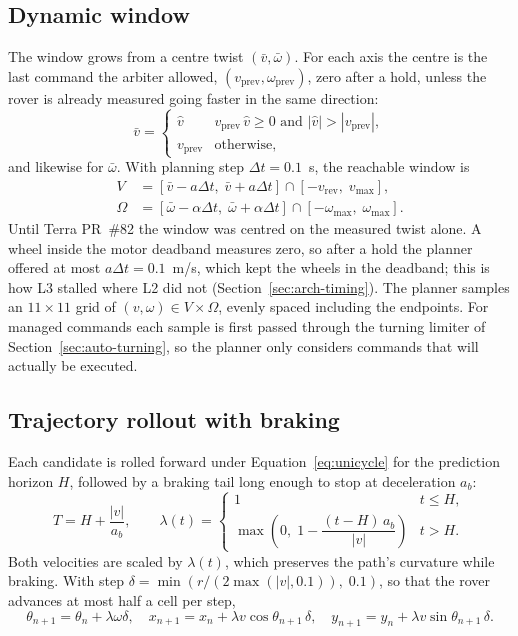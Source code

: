 \subsection{Dynamic window}

The window grows from a centre twist $(\bar v, \bar\omega)$.
For each axis the centre is the last command the arbiter allowed, $(v_{\text{prev}}, \omega_{\text{prev}})$, zero after a hold, unless the rover is already measured going faster in the same direction:
\begin{equation}
  \bar v = \begin{cases} \hat v & v_{\text{prev}}\,\hat v \ge 0 \text{ and } |\hat v| > |v_{\text{prev}}|, \\ v_{\text{prev}} & \text{otherwise,} \end{cases}
\end{equation}
and likewise for $\bar\omega$.
With planning step $\Delta t = 0.1$~s, the reachable window is
\begin{align}
  V &= [\bar v - a\Delta t,\; \bar v + a\Delta t] \cap [-v_{\text{rev}},\; v_{\max}], \\
  \Omega &= [\bar\omega - \alpha\Delta t,\; \bar\omega + \alpha\Delta t] \cap [-\omega_{\max},\; \omega_{\max}].
\end{align}
Until Terra PR~\#82 the window was centred on the measured twist alone.
A wheel inside the motor deadband measures zero, so after a hold the planner offered at most $a\Delta t = 0.1$~m/s, which kept the wheels in the deadband; this is how L3 stalled where L2 did not (Section~\ref{sec:arch-timing}).
The planner samples an $11 \times 11$ grid of $(v, \omega) \in V \times \Omega$, evenly spaced including the endpoints.
For managed commands each sample is first passed through the turning limiter of Section~\ref{sec:auto-turning}, so the planner only considers commands that will actually be executed.

\subsection{Trajectory rollout with braking}

Each candidate is rolled forward under Equation~\eqref{eq:unicycle} for the prediction horizon $H$, followed by a braking tail long enough to stop at deceleration $a_b$:
\begin{equation}
  T = H + \frac{|v|}{a_b}, \qquad
  \lambda(t) = \begin{cases} 1 & t \le H, \\ \max\!\left(0,\; 1 - \dfrac{(t - H)\,a_b}{|v|}\right) & t > H. \end{cases}
\end{equation}
Both velocities are scaled by $\lambda(t)$, which preserves the path's curvature while braking.
With step $\delta = \min\!\left(r / (2\max(|v|, 0.1)),\; 0.1\right)$, so that the rover advances at most half a cell per step,
\begin{equation}
  \theta_{n+1} = \theta_n + \lambda\omega\delta, \quad
  x_{n+1} = x_n + \lambda v \cos\theta_{n+1}\,\delta, \quad
  y_{n+1} = y_n + \lambda v \sin\theta_{n+1}\,\delta.
\end{equation}

